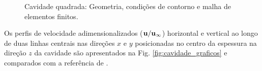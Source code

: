 \documentclass[tese_patricia]{subfiles}%
\begin{document}
\begin{figure}[!htb]
	\centering
	 \quad
	\caption{Cavidade quadrada: Geometria, condições de contorno e malha de elementos finitos.}
\end{figure}

Os perfis de velocidade adimensionalizados ($\mathbf{u}/\mathbf{u}_{\infty}$) horizontal e vertical ao longo de duas linhas centrais nas direções $x$ e $y$ posicionadas no centro da espessura na direção $z$ da cavidade são apresentados na Fig. \ref{fig:cavidade_graficos} e comparados com a referência de .
\end{document}
